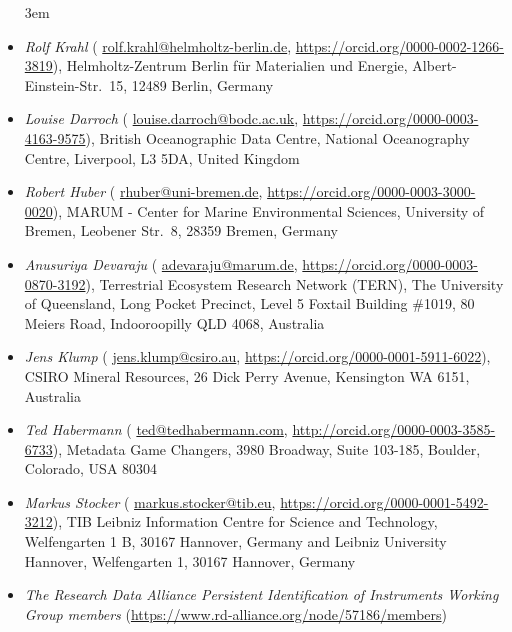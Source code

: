\documentclass[titlepage=true,twoside=false,DIV=13]{scrartcl}
\begin{document}
\begin{itemize}\emergencystretch 3em
\item \emph{Rolf Krahl}
  ({\small
  \href{mailto:rolf.krahl@helmholtz-berlin.de}{rolf.krahl@helmholtz-berlin.de},
  \url{https://orcid.org/0000-0002-1266-3819}}),
  Helmholtz-Zentrum Berlin für Materialien und Energie,
  Albert-Einstein-Str.\ 15, 12489 Berlin, Germany
\item \emph{Louise Darroch}
  ({\small
  \href{mailto:louise.darroch@bodc.ac.uk}{louise.darroch@bodc.ac.uk},
  \url{https://orcid.org/0000-0003-4163-9575}}),
  British Oceanographic Data Centre, National Oceanography Centre,
  Liverpool, L3 5DA, United Kingdom
\item \emph{Robert Huber}
  ({\small
  \href{mailto:rhuber@uni-bremen.de}{rhuber@uni-bremen.de},
  \url{https://orcid.org/0000-0003-3000-0020}}),
  MARUM - Center for Marine Environmental Sciences, University of Bremen,
  Leobener Str.\ 8, 28359 Bremen, Germany
\item \emph{Anusuriya Devaraju}
  ({\small
  \href{mailto:adevaraju@marum.de}{adevaraju@marum.de},
  \url{https://orcid.org/0000-0003-0870-3192}}),
  Terrestrial Ecosystem Research Network (TERN), The University of
  Queensland, Long Pocket Precinct, Level 5 Foxtail Building \#1019,
  80 Meiers Road, Indooroopilly QLD 4068, Australia
\item \emph{Jens Klump}
  ({\small
  \href{mailto:jens.klump@csiro.au}{jens.klump@csiro.au},
  \url{https://orcid.org/0000-0001-5911-6022}}),
  CSIRO Mineral Resources, 26 Dick Perry Avenue, Kensington WA 6151,
  Australia
\item \emph{Ted Habermann}
  ({\small
  \href{mailto:ted@tedhabermann.com}{ted@tedhabermann.com},
  \url{http://orcid.org/0000-0003-3585-6733}}),
  Metadata Game Changers,
  3980 Broadway, Suite 103-185, Boulder, Colorado, USA 80304
\item \emph{Markus Stocker}
  ({\small
  \href{mailto:markus.stocker@tib.eu}{markus.stocker@tib.eu},
  \url{https://orcid.org/0000-0001-5492-3212}}),
  TIB Leibniz Information Centre for Science and Technology,
  Welfengarten 1 B, 30167 Hannover, Germany and
  Leibniz University Hannover, Welfengarten 1, 30167 Hannover, Germany
\item \emph{The Research Data Alliance Persistent Identification of Instruments
  Working Group members}
  ({\small \url{https://www.rd-alliance.org/node/57186/members}})
\end{itemize}

\tableofcontents
\cleardoublepage
{}
\end{document}
